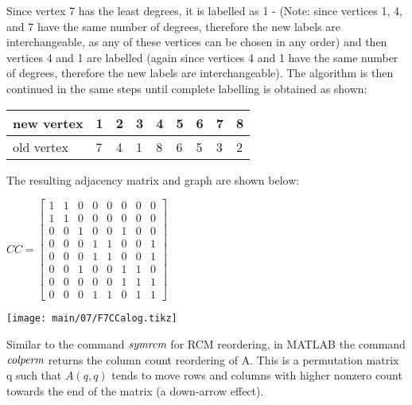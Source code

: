   \rmfamily
  \noindent
  \vskip 5pt
  Since vertex 7 has the least degrees, it is labelled as 1 - (Note: since
  vertices 1, 4, and 7 have the same number of degrees, therefore the new labels
  are interchangeable, as any of these vertices can be chosen in any order) and
  then vertices 4 and 1 are labelled (again since vertices 4 and 1 have the same
  number of degrees, therefore the new labels are interchangeable). The algorithm
  is then continued in the same steps until complete labelling is obtained as
  shown:
  \noindent
    \begin{center}
      \begin{tabular}{ l | l l l l l l l l }
      new vertex   & 1 & 2 & 3 & 4 & 5 & 6 & 7 & 8 \\
      \hline
      old vertex   & 7 & 4 & 1 & 8 & 6 & 5 & 3 & 2 \\
    \end{tabular}
  \end{center}
  \noindent
  \vskip 7pt
  The resulting adjacency matrix and graph are shown below:
  \begin{table}[H]
    \begin{minipage}[b]{0.49\linewidth}
      \vskip 5pt
      \begin{center}
        $CC=
        \begin{bmatrix}
          1 & 1 & 0 & 0 & 0 & 0 & 0 & 0 \\
          1 & 1 & 0 & 0 & 0 & 0 & 0 & 0 \\
          0 & 0 & 1 & 0 & 0 & 1 & 0 & 0 \\
          0 & 0 & 0 & 1 & 1 & 0 & 0 & 1 \\
          0 & 0 & 0 & 1 & 1 & 0 & 0 & 1 \\
          0 & 0 & 1 & 0 & 0 & 1 & 1 & 0 \\
          0 & 0 & 0 & 0 & 0 & 1 & 1 & 1 \\
          0 & 0 & 0 & 1 & 1 & 0 & 1 & 1
        \end{bmatrix}$
      \end{center}
      \vspace{5mm}
    \end{minipage}
    \begin{minipage}[b]{0.5\linewidth}
      \texttt{[image: main/07/F7CCalog.tikz]}
    \end{minipage}
  \end{table}
  \noindent
  Similar to the command $\emph{symrcm}$ for RCM reordering, in MATLAB the command
  $\emph{colperm}$ returns the column count reordering of A. This is a permutation
  matrix q such that $A(q,q)$ tends to move rows and columns with higher nonzero
  count towards the end of the matrix (a down-arrow effect).
  
